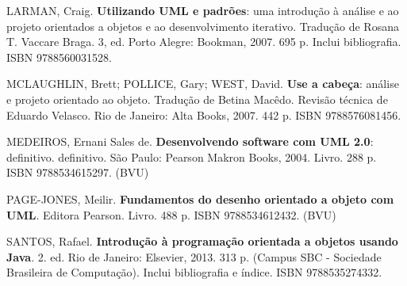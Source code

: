 \begin{pud}
\begin{bibbasica}
	\end{bibbasica}
	
	\begin{bibcomplementar}
    
        \item LARMAN, Craig. \textbf{Utilizando UML e padrões}: uma introdução à análise e ao projeto orientados a objetos e ao desenvolvimento iterativo. Tradução de Rosana T. Vaccare Braga. 3, ed. Porto Alegre: Bookman, 2007. 695 p. Inclui bibliografia. ISBN 9788560031528. 
		\item MCLAUGHLIN, Brett; POLLICE, Gary; WEST, David. \textbf{Use a cabeça}: análise  e projeto orientado ao objeto. Tradução de Betina Macêdo. Revisão técnica de Eduardo Velasco. Rio de Janeiro: Alta Books, 2007. 442 p. ISBN 9788576081456.
		\item MEDEIROS, Ernani Sales de. \textbf{Desenvolvendo software com UML 2.0}: definitivo. definitivo. São Paulo:  Pearson Makron Books, 2004. Livro. 288 p. ISBN 9788534615297.  (BVU)
		\item PAGE-JONES, Meilir. \textbf{Fundamentos do desenho orientado a objeto com UML}.  Editora Pearson. Livro. 488 p. ISBN 9788534612432.  (BVU)
		\item SANTOS, Rafael. \textbf{Introdução à programação orientada a objetos usando Java}. 2. ed. Rio de Janeiro: Elsevier, 2013. 313 p. (Campus SBC - Sociedade Brasileira de Computação). Inclui bibliografia e índice. ISBN 9788535274332.
	
	\end{bibcomplementar}
		
	
\end{pud}



